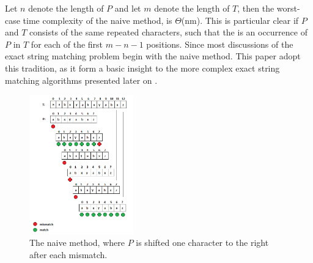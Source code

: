 \documentclass[12pt]{article} %
\begin{document}
\newline
Let $n$ denote the length of $P$ and let $m$ denote the length of $T$, then the worst-case time complexity of the naive method, is $\Theta$(nm). This is particular clear if $P$ and $T$ consists of the same repeated characters, such that the is an occurrence of $P$ in $T$ for each of the first $m - n - 1$ positions.
\newline
Since most discussions of the exact string matching problem begin with the naive method. This paper adopt this tradition, as it form a basic insight to the more complex exact string matching algorithms presented later on \cite{gusfield}.
\begin{figure}[H]
    \centering
    \includegraphics[width=0.4\textwidth]{comparisonbased1}
    \captionsetup{width=0.8\textwidth}
    \caption{The naive method, where $P$ is shifted one character to the right after each mismatch.}
    \label{fig:comparisonbased1}
\end{figure}
\end{document}
